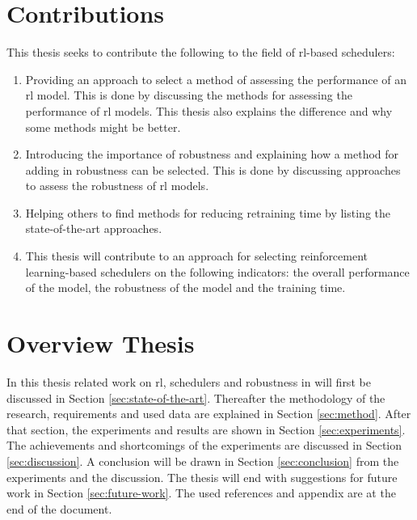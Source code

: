 \section{Contributions}\label{contributions}

This thesis seeks to contribute the following to the field of \gls{rl}-based
schedulers:

\begin{enumerate}[noitemsep]
    \item Providing an approach to select a method of assessing the
        performance of an \gls{rl} model. This is done by discussing the methods
        for assessing the performance of \gls{rl} models. This thesis also
        explains the difference and why some methods might be better.
    \item Introducing the importance of robustness and explaining how a method
        for adding in robustness can be selected. This is done by discussing
        approaches to assess the robustness of \gls{rl} models.
    \item Helping others to find methods for reducing retraining time by
        listing the state-of-the-art approaches.
    \item This thesis will contribute to an approach for selecting
        reinforcement learning-based schedulers on the following indicators:
        the overall performance of the model, the robustness of the model and
        the training time.
\end{enumerate}


\section{Overview Thesis}

In this thesis related work on \gls{rl}, schedulers and robustness in \rl will
first be discussed in Section \ref{sec:state-of-the-art}. Thereafter the
methodology of the research, requirements and used data are explained in
Section \ref{sec:method}. After that section, the experiments and results are
shown in Section \ref{sec:experiments}. The achievements and shortcomings of
the experiments are discussed in Section \ref{sec:discussion}. A conclusion
will be drawn in Section \ref{sec:conclusion} from the experiments and the
discussion. The thesis will end with suggestions for future work in Section
\ref{sec:future-work}. The used references and appendix are at the end of the
document.
